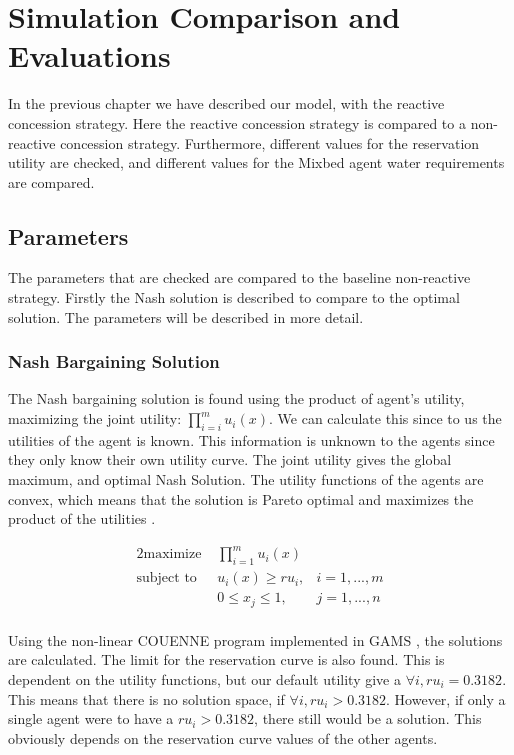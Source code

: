 \chapter{Simulation Comparison and Evaluations}
\label{ch:eval}
In the previous chapter we have described our model, with the reactive concession strategy. Here the reactive concession strategy is compared to a non-reactive concession strategy. Furthermore, different values for the reservation utility are checked, and different values for the Mixbed agent water requirements are compared. 

\section{Parameters}
The parameters that are checked are compared to the baseline non-reactive strategy. Firstly the Nash solution is described to compare to the optimal solution. The parameters will be described in more detail.

\subsection{Nash Bargaining Solution}
The Nash bargaining solution is found using the product of agent's utility, maximizing the joint utility: $\prod_{i=i}^{m}u_i(x).$ We can calculate this since to us the utilities of the agent is known. This information is unknown to the agents since they only know their own utility curve. The joint utility gives the global maximum, and optimal Nash Solution. The utility functions of the agents are convex, which means that the solution is Pareto optimal and maximizes the product of the utilities \citep{nash1950bargaining, roth1977individual, lensberg1988stability}. 

\begin{alignat*}{2}
\text{maximize }   	& \prod_{i=1}^m u_i(x)  \\
\text{subject to \ } 	& u_i(x) \geq ru_i, & i = 1,...,m\\
& 0\leq x_j\leq 1, & j = 1,...,n\\
\end{alignat*}

Using the non-linear COUENNE program \citep{belotti2013mixed} implemented in GAMS \citep{GamsSoftware2013}, the solutions are calculated. The limit for the reservation curve is also found. This is dependent on the utility functions, but our default utility give a $\forall i,  ru_i = 0.3182$. This means that there is no solution space, if $\forall i, ru_i > 0.3182$. However, if only a single agent were to have a $ru_i > 0.3182$, there still would be a solution. This obviously depends on the reservation curve values of the other agents.


